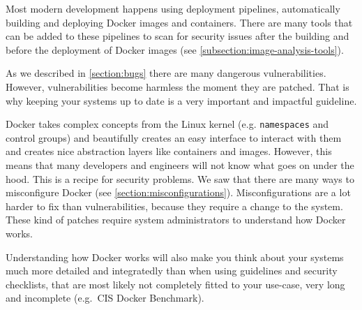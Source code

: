 \medskip

Most modern development happens using deployment pipelines, automatically building and deploying Docker images and containers. There are many tools that can be added to these pipelines to scan for security issues after the building and before the deployment of Docker images (see \autoref{subsection:image-analysis-tools}).

\medskip

As we described in \autoref{section:bugs} there are many dangerous vulnerabilities. However, vulnerabilities become harmless the moment they are patched. That is why keeping your systems up to date is a very important and impactful guideline.

\medskip

Docker takes complex concepts from the Linux kernel (e.g. \lstinline{namespaces} and control groups) and beautifully creates an easy interface to interact with them and creates nice abstraction layers like containers and images. However, this means that many developers and engineers will not know what goes on under the hood. This is a recipe for security problems. We saw that there are many ways to misconfigure Docker (see \autoref{section:misconfigurations}). Misconfigurations are a lot harder to fix than vulnerabilities, because they require a change to the system. These kind of patches require system administrators to understand how Docker works.


Understanding how Docker works will also make you think about your systems much more detailed and integratedly than when using guidelines and security checklists, that are most likely not completely fitted to your use-case, very long and incomplete (e.g.\ CIS Docker Benchmark).
